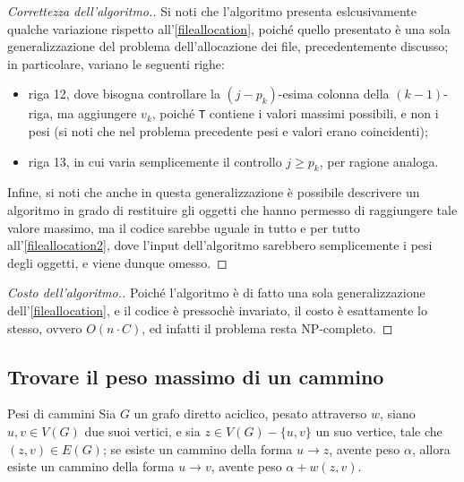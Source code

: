 \documentclass[a4paper, 12pt]{report}
\begin{document}
    \begin{proof}[Correttezza dell'algoritmo.]
        Si noti che l'algoritmo presenta eslcusivamente qualche variazione rispetto all'\cref{fileallocation}, poiché quello presentato è una sola generalizzazione del problema dell'allocazione dei file, precedentemente discusso; in particolare, variano le seguenti righe:

        \begin{itemize}
            \item riga 12, dove bisogna controllare la $(j - p_k)$-esima colonna della $(k -1)$-riga, ma aggiungere $v_k$, poiché \texttt{T} contiene i valori massimi possibili, e non i pesi (si noti che nel problema precedente pesi e valori erano coincidenti);
            \item riga 13, in cui varia semplicemente il controllo $j \ge p_k$, per ragione analoga.
        \end{itemize}

        Infine, si noti che anche in questa generalizzazione è possibile descrivere un algoritmo in grado di restituire gli oggetti che hanno permesso di raggiungere tale valore massimo, ma il codice sarebbe uguale in tutto e per tutto all'\cref{fileallocation2}, dove l'input dell'algoritmo sarebbero semplicemente i pesi degli oggetti, e viene dunque omesso.
    \end{proof}

    \begin{proof}[Costo dell'algoritmo.]
        Poiché l'algoritmo è di fatto una sola generalizzazione dell'\cref{fileallocation}, e il codice è pressochè invariato, il costo è esattamente lo stesso, ovvero $O(n \cdot C)$, ed infatti il problema resta NP-completo.
    \end{proof}

    \subsection{Trovare il peso massimo di un cammino}

    \begin{framedlem}{Pesi di cammini}
        \label{lemma grafi max}
        Sia $G$ un grafo diretto aciclico, pesato attraverso $w$, siano $u, v \in V(G)$ due suoi vertici, e sia $z \in V(G) - \{u, v\}$ un suo vertice, tale che $(z, v) \in E(G)$; se esiste un cammino della forma $u \rightarrow z$, avente peso $\alpha$, allora esiste un cammino della forma $u \rightarrow v$, avente peso $\alpha + w(z, v)$.
    \end{framedlem}
\end{document}
